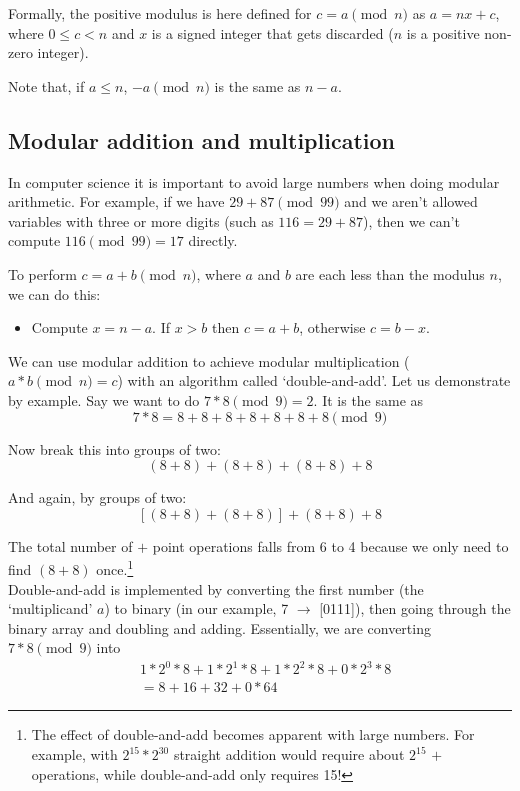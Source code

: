 Formally, the positive modulus is here defined for $c = a \pmod n$ as $a = n x + c$, where $0\leq{c}<{n}$ and $x$ is a signed integer that gets discarded ($n$ is a positive non-zero integer).

Note that, if $a \leq n$, $-a \pmod n$ is the same as $n - a$.


\subsection{Modular addition and multiplication}
\label{subsec:modular-addition-multiplication}

In computer science it is important to avoid large numbers when doing modular arithmetic. For example, if we have $29+87 \pmod{99}$ and we aren't allowed variables with three or more digits (such as $116 = 29+87$), then we can't compute $116 \pmod{99} = 17$ directly.

To perform $c = a+b \pmod n$, where $a$ and $b$ are each less than the modulus $n$, we can do this:
\begin{itemize}
	\item Compute $x = n-a$. If $x > b$ then $c = a+b$, otherwise $c = b - x$.
\end{itemize}

We can use modular addition to achieve modular multiplication ($a*b \pmod n = c$) with an algorithm called `double-and-add'. Let us demonstrate by example. Say we want to do $7*8 \pmod 9 = 2$. It is the same as 
\[7*8 = 8+8+8+8+8+8+8 \pmod 9\]

Now break this into groups of two:
\[(8+8) + (8+8) + (8+8) + 8\]

And again, by groups of two:
\[[(8+8) + (8+8)] + (8+8) + 8\]

The total number of $+$ point operations falls from 6 to 4 because we only need to find $(8+8)$ once.\footnote{The effect of double-and-add becomes apparent with large numbers. For example, with $2^{15} * 2^{30}$ straight addition would require about $2^{15}$ $+$ operations, while double-and-add only requires 15!}\\

Double-and-add is implemented by converting the first number (the `multiplicand' $a$) to binary (in our example, 7 $\rightarrow$ [0111]), then going through the binary array and doubling and adding. Essentially, we are converting $7*8 \pmod{9}$ into\vspace{.155cm}
\begin{align*}
    &1*2^0*8 + 1*2^1*8 + 1*2^2*8 + 0*2^3*8\\
    &= 8 + 16 + 32 + 0*64
\end{align*}

